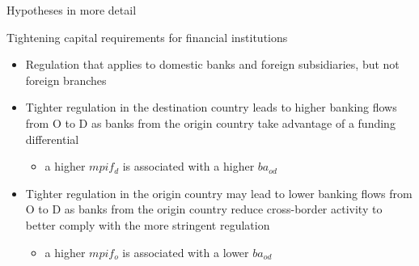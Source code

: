 \documentclass{beamer}
\begin{document}

\begin{frame}{Hypotheses in more detail}
\begin{block}{Tightening capital requirements for financial institutions}
\begin{itemize}
\item Regulation that applies to domestic banks and foreign subsidiaries, but not foreign branches
\item Tighter regulation in the destination country leads to higher banking flows from O to D as banks from the origin country take advantage of a funding differential
\begin{itemize}
\item a higher $mpif_{d}$ is associated with a higher $ba_{od}$
\end{itemize}
\item Tighter regulation in the origin country may lead to lower banking flows from O to D as banks from the origin country reduce cross-border activity to better comply with the more stringent regulation
\begin{itemize}
\item a higher $mpif_{o}$ is associated with a lower $ba_{od}$
\end{itemize}
\end{itemize}
\end{block}
\end{frame}
\end{document}
